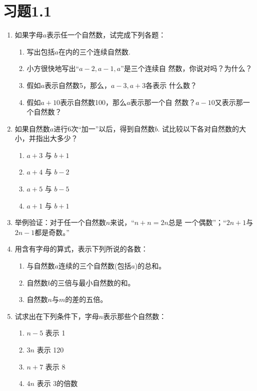 \section*{习题1.1}

\begin{enumerate}
\item 如果字母$a$表示任一个自然数，试完成下列各题：
    \begin{enumerate}
        \item 写出包括$a$在内的三个连续自然数.
        \item 小方很快地写出“$a-2, a-1, a$”是三个连续自
  然数，你说对吗？为什么？
  \item 假如$a$表示自然数5，那么，$a-3,a+3$各表示
  什么数？
  \item 假如$a+10$表示自然数100，那么$a$表示那一个自
  然数？$a-10$又表示那一个自然数？
  
    \end{enumerate}

\item  如果自然数$a$进行6次“加一”以后，得到自然数$b$.
试比较以下各对自然数的大小，并指出大多少？
   \begin{multicols}{2}
\begin{enumerate}
    \item $a+3$ 与 $b+1$
    \item $a+4$ 与 $b-2$
    \item $a+5$ 与 $b-5$
    \item $a+1$ 与 $b+1$
\end{enumerate}
\end{multicols}

\item  举例验证：对于任一个自然数$n$来说，“$n+n=2n$总是
一个偶数”；“$2n + 1$与$2n-1$都是奇数。”

\item 用含有字母的算式，表示下列所说的各数：
\begin{enumerate}
    \item 与自然数$a$连续的三个自然数(包括$a$)的总和。
    \item 自然数$b$的三倍与最小自然数的和。
    \item 自然数$n$与$m$的差的五倍。
\end{enumerate}

\item 试求出在下列条件下，字母$n$表示那些个自然数：
\begin{enumerate}
    \item $n-5$ 表示 1
    \item  $3n$ 表示 120
    \item  $n+7$ 表示 8
    \item  $4n$ 表示 3的倍数
\end{enumerate}


\end{enumerate}
